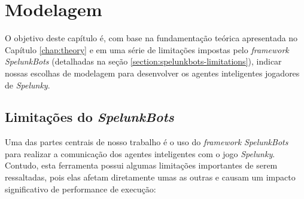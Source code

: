 \chapter{\label{chap:modeling}Modelagem}
O objetivo deste capítulo é, com base na fundamentação teórica apresentada no
Capítulo \ref{chap:theory} e em uma série de limitações impostas pelo
\textit{framework} \textit{SpelunkBots} (detalhadas na seção
\ref{section:spelunkbots-limitations}), indicar nossas escolhas de modelagem
para desenvolver os agentes inteligentes jogadores de \textit{Spelunky}.



\section{\label{section:spelunkbots-limitations}Limitações do
\textit{SpelunkBots}}
Uma das partes centrais de nosso trabalho é o uso do \textit{framework}
\textit{SpelunkBots} para realizar a comunicação dos agentes inteligentes com o
jogo \textit{Spelunky}. Contudo, esta ferramenta possui algumas limitações
importantes de serem ressaltadas, pois elas afetam diretamente umas as outras e
causam um impacto significativo de performance de execução:

